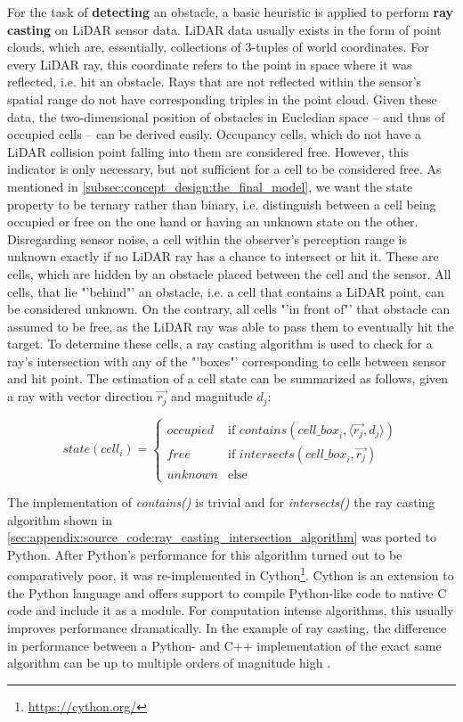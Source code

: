 For the task of \textbf{detecting} an obstacle, a basic heuristic is applied to  perform \textbf{ray casting} on LiDAR sensor data. LiDAR data usually exists in the form of point clouds, which are, essentially, collections of 3-tuples of world coordinates. For every LiDAR ray, this coordinate refers to the point in space where it was reflected, i.e. hit an obstacle. Rays that are not reflected within the sensor's spatial range do not have corresponding triples in the point cloud. Given these data, the two-dimensional position of obstacles in Eucledian space – and thus of occupied cells – can be derived easily. Occupancy cells, which do not have a LiDAR collision point falling into them are considered free. However, this indicator is only necessary, but not sufficient for a cell to be considered free. As mentioned in \cref{subsec:concept_design:the_final_model}, we want the state property to be ternary rather than binary, i.e. distinguish between a cell being occupied or free on the one hand or having an unknown state on the other. Disregarding sensor noise, a cell within the observer's perception range is unknown exactly if no LiDAR ray has a chance to intersect or hit it. These are cells, which are hidden by an obstacle placed between the cell and the sensor. All cells, that lie "'behind"' an obstacle, i.e. a cell that contains a LiDAR point, can be considered unknown. On the contrary, all cells "'in front of"' that obstacle can assumed to be free, as the LiDAR ray was able to pass them to eventually hit the target. To determine these cells, a ray casting algorithm is used to check for a ray's intersection with any of the "'boxes"' corresponding to cells between sensor and hit point. The estimation of a cell state can be summarized as follows, given a ray with vector direction $\vec{r_j}$ and magnitude $d_j$:

$$
\textit{state}(cell_i) = 
\begin{cases}
\textit{occupied} & \text{if\ } \textit{contains}(\textit{cell\_box}_i, \langle \vec{r_j}, d_j \rangle) \\
\textit{free} & \text{if\ } \textit{intersects}(\textit{cell\_box}_i, \vec{r_j}) \\
\textit{unknown} & \text{else}
\end{cases}
$$

The implementation of \textit{contains()} is trivial and for \textit{intersects()} the ray casting algorithm shown in \cref{sec:appendix:source_code:ray_casting_intersection_algorithm} was ported to Python. After Python's performance for this algorithm turned out to be comparatively poor, it was re-implemented in Cython\footnote{\url{https://cython.org/}}. Cython is an extension to the Python language and offers support to compile Python-like code to native C code and include it as a module. For computation intense algorithms, this usually improves performance dramatically. In the example of ray casting, the difference in performance between a Python- and C++ implementation of the exact same algorithm can be up to multiple orders of magnitude high \cite{Novak2017}.


